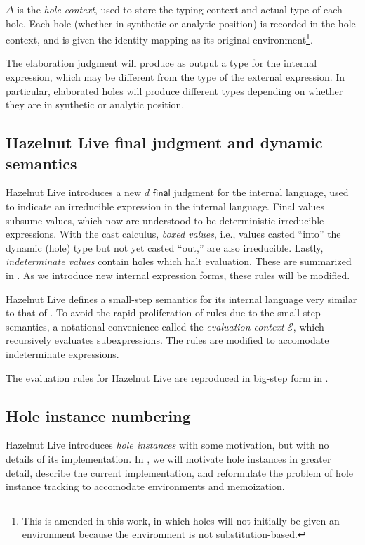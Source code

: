 $\Delta$ is the \textit{hole context}, used to store the typing context and actual type of each hole. Each hole (whether in synthetic or analytic position) is recorded in the hole context, and is given the identity mapping as its original environment\footnote{This is amended in this work, in which holes will not initially be given an environment because the environment is not substitution-based.}.

The elaboration judgment will produce as output a type for the internal expression, which may be different from the type of the external expression. In particular, elaborated holes will produce different types depending on whether they are in synthetic or analytic position.

\subsection{Hazelnut Live final judgment and dynamic semantics}
\label{sec:hazel-dynamics}

Hazelnut Live introduces a new $d\textsf{ final}$ judgment for the internal language, used to indicate an irreducible expression in the internal language. Final values subsume values, which now are understood to be deterministic irreducible expressions. With the cast calculus, \textit{boxed values}, i.e., values casted ``into'' the dynamic (hole) type but not yet casted ``out,'' are also irreducible. Lastly, \textit{indeterminate values} contain holes which halt evaluation. These are summarized in . As we introduce new internal expression forms, these rules will be modified.

Hazelnut Live defines a small-step semantics for its internal language very similar to that of \gtclc{}. To avoid the rapid proliferation of rules due to the small-step semantics, a notational convenience called the \textit{evaluation context} $\mathcal{E}$, which recursively evaluates subexpressions. The rules are modified to accomodate indeterminate expressions.

The evaluation rules for Hazelnut Live are reproduced in big-step form in .

\subsection{Hole instance numbering}
\label{sec:hole-instance-numbering}

Hazelnut Live introduces \textit{hole instances} with some motivation, but with no details of its implementation. In , we will motivate hole instances in greater detail, describe the current implementation, and reformulate the problem of hole instance tracking to accomodate environments and memoization.

